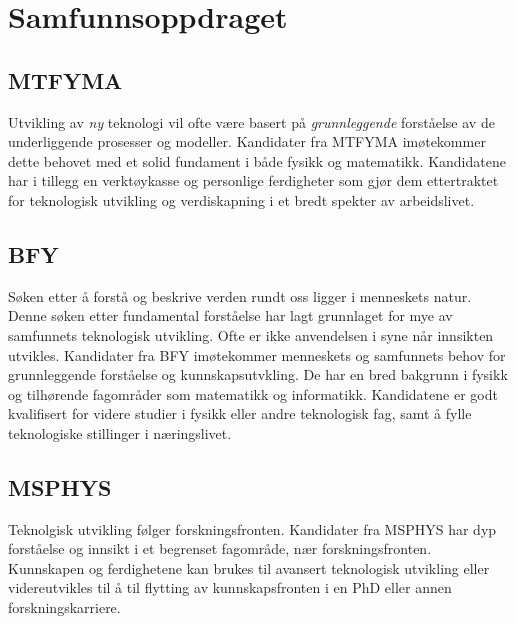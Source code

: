 \chapter{Samfunnsoppdraget}
\label{c:mission}

\section{MTFYMA}
Utvikling av \emph{ny} teknologi vil ofte være basert på \emph{grunnleggende} forståelse av de underliggende prosesser og modeller. Kandidater fra MTFYMA imøtekommer dette behovet med et solid fundament i både fysikk og matematikk. Kandidatene har i tillegg en verktøykasse og personlige ferdigheter som gjør dem ettertraktet for teknologisk utvikling og verdiskapning i et bredt spekter av arbeidslivet.

\section{BFY}
Søken etter å forstå og beskrive verden rundt oss ligger i menneskets natur. Denne søken etter fundamental forståelse har lagt grunnlaget for mye av samfunnets teknologisk utvikling. Ofte er ikke anvendelsen i syne når innsikten utvikles. Kandidater fra BFY imøtekommer menneskets og samfunnets behov for grunnleggende forståelse og kunnskapsutvkling. De har en bred bakgrunn i fysikk og tilhørende fagområder som matematikk og informatikk. Kandidatene er godt kvalifisert for videre studier i fysikk eller andre teknologisk fag, samt å fylle teknologiske stillinger i næringslivet.

\section{MSPHYS}
Teknolgisk utvikling følger forskningsfronten. Kandidater fra MSPHYS har dyp forståelse og innsikt i et begrenset fagområde, nær forskningsfronten. Kunnskapen og ferdighetene kan brukes til avansert teknologisk utvikling eller videreutvikles til å til flytting av kunnskapsfronten i en PhD eller annen forskningskarriere.